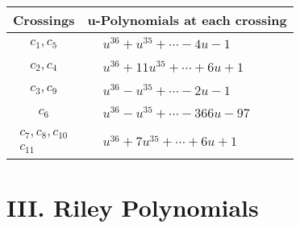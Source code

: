 \documentclass[1p]{elsarticle_modified}
\theoremstyle{definition}
\begin{document}
\begin{tabular}{m{50pt}|m{274pt}}
Crossings & \hspace{64pt}u-Polynomials at each crossing \\
\hline $$\begin{aligned}c_{1},c_{5}\end{aligned}$$&$\begin{aligned}
&u^{36}+u^{35}+\cdots-4 u-1
\end{aligned}$\\
\hline $$\begin{aligned}c_{2},c_{4}\end{aligned}$$&$\begin{aligned}
&u^{36}+11 u^{35}+\cdots+6 u+1
\end{aligned}$\\
\hline $$\begin{aligned}c_{3},c_{9}\end{aligned}$$&$\begin{aligned}
&u^{36}- u^{35}+\cdots-2 u-1
\end{aligned}$\\
\hline $$\begin{aligned}c_{6}\end{aligned}$$&$\begin{aligned}
&u^{36}- u^{35}+\cdots-366 u-97
\end{aligned}$\\
\hline $$\begin{aligned}c_{7},c_{8},c_{10}\\c_{11}\end{aligned}$$&$\begin{aligned}
&u^{36}+7 u^{35}+\cdots+6 u+1
\end{aligned}$\\
\hline
\end{tabular}\newpage\renewcommand{\arraystretch}{1}
\centering \section*{ III. Riley Polynomials}
\end{document}
